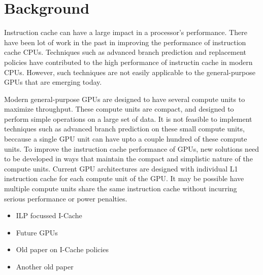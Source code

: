 \section{Background}

Instruction cache can have a large impact in a processor's performance. There have been lot of work in the past in improving the performance of instruction cache  CPUs. Techniques such as advanced branch prediction\cite{yeh93} and replacement policies\cite{smith85} have contributed to the high performance of instructin cache in modern CPUs. However, such techniques are not easily applicable to the general-purpose GPUs that are emerging today. 


Modern general-purpose GPUs are designed to have several compute units to maximize throughput. These compute units are compact, and designed to perform simple operations on a large set of data. It is not feasible to implement techniques such as advanced branch prediction on these small compute units, beccause a single GPU unit can have upto a couple hundred of these compute units. To improve the instruction cache performance of GPUs, new solutions need to be developed in ways that maintain the compact and simplistic nature of the compute units. Current GPU architectures are designed with individual L1 instruction cache for each compute unit of the GPU\cite{keckler2011}. It may be possible have multiple compute units share the same instruction cache without incurring serious performance or power penalties.


\begin{itemize}
\item ILP focussed I-Cache~\cite{yeh93}
\item Future GPUs~\cite{keckler2011} 
\item Old paper on I-Cache policies~\cite{smith85} 
\item Another old paper~\cite{smith83} 
\end{itemize}
